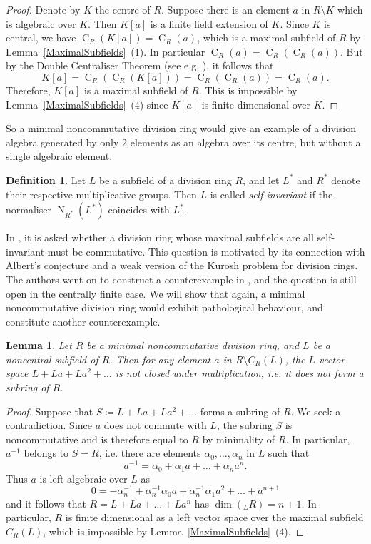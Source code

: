 \documentclass[11pt]{article}
\DeclareMathOperator{\C}{C}
\DeclareMathOperator{\N}{N}
\newtheorem{lemma}[corollary]{Lemma}
\theoremstyle{definition}
\newtheorem{definition}[corollary]{Definition}
\begin{document}
\begin{proof}
Denote by $K$ the centre of $R$. Suppose there is an element $a$ in $R\setminus K$ which is algebraic over $K$. Then $K[a]$ is a finite field extension of $K$. Since $K$ is central, we have $\C_R(K[a])=\C_R(a)$, which is a maximal subfield of $R$ by Lemma~\ref{MaximalSubfields}~(1). In particular $\C_R(a)=\C_R\left(\C_R(a)\right)$. But by the Double Centraliser Theorem (see e.g. \cite[Theorem~15.4]{FirstCourseLam}), it follows that
\[K[a]=\C_R(\C_R(K[a]))=\C_R(\C_R(a))=\C_R(a).\]
Therefore, $K[a]$ is a maximal subfield of $R$. This is impossible by Lemma~\ref{MaximalSubfields}~(4) since $K[a]$ is finite dimensional over $K$.
\end{proof}

So a minimal noncommutative division ring would give an example of a division algebra generated by only $2$ elements as an algebra over its centre, but without a single algebraic element.

\begin{definition}
Let $L$ be a subfield of a division ring $R$, and let $L^\ast$ and $R^\ast$ denote their respective multiplicative groups. Then $L$ is called \textit{self-invariant} if the normaliser $\N_{R^\ast}(L^{\ast})$ coincides with $L^\ast$.
\end{definition}

In \cite[Question~1.2]{Self-InvariantMaximalSubfields}, it is asked whether a division ring whose maximal subfields are all self-invariant must be commutative. This question is motivated by its connection with Albert's conjecture and a weak version of the Kurosh problem for division rings. The authors went on to construct a counterexample in \cite[Theorem~4.4]{Self-InvariantMaximalSubfields}, and the question is still open in the centrally finite case. We will show that again, a minimal noncommutative division ring would exhibit pathological behaviour, and constitute another counterexample.

\begin{lemma}\label{VectorSpaceOverMaximalSubfield}
Let $R$ be a minimal noncommutative division ring, and $L$ be a noncentral subfield of $R$. Then for any element $a$ in $R\setminus C_R(L)$, the $L$-vector space $L+La+La^2+\ldots$ is not closed under multiplication, i.e. it does not form a subring of $R$.
\end{lemma}

\begin{proof}
Suppose that $S\coloneqq L+La+La^2+\ldots$ forms a subring of $R$. We seek a contradiction. Since $a$ does not commute with $L$, the subring $S$ is noncommutative and is therefore equal to $R$ by minimality of $R$. In particular, $a^{-1}$ belongs to $S=R$, i.e. there are elements $\alpha_0,\ldots,\alpha_n$ in $L$ such that
\[a^{-1}=\alpha_0+\alpha_1a+\ldots+\alpha_na^n.\]
Thus $a$ is left algebraic over $L$ as
\[0=-\alpha_n^{-1}+\alpha_n^{-1}\alpha_0a+\alpha_n^{-1}\alpha_1a^2+\ldots+a^{n+1}\]
and it follows that $R=L+La+\ldots+La^n$ has $\dim\left({}_{L}R\right)=n+1$. In particular, $R$ is finite dimensional as a left vector space over the maximal subfield $C_R(L)$, which is impossible by Lemma~\ref{MaximalSubfields}~(4).
\end{proof}
\end{document}
